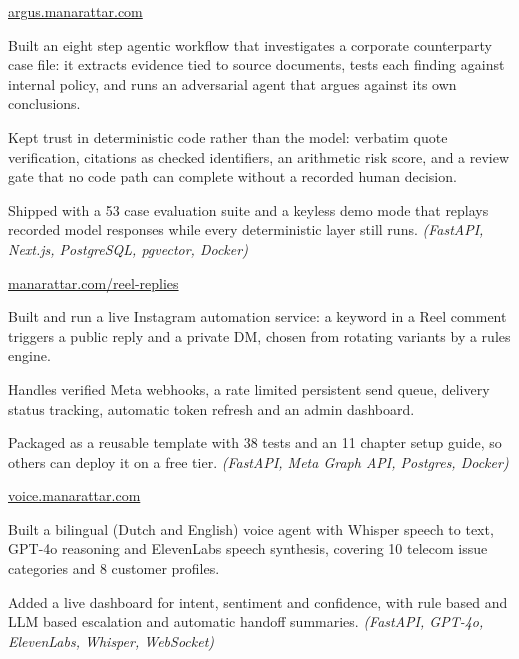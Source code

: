 \documentclass[10pt]{article}
\newcommand{\product}[2]{\Needspace{4\baselineskip}\vspace{2pt}{\bfseries #1}\hfill{\footnotesize #2}\par\vspace{-1pt}}
\newcommand{\live}[2]{\href{https://#1}{\color{link}#2}}
\begin{document}
\product{ARGUS: Agentic Risk Governance and Understanding System}{\live{argus.manarattar.com}{argus.manarattar.com}}
\begin{tights}
  \item Built an eight step agentic workflow that investigates a corporate counterparty case file: it extracts evidence tied to source documents, tests each finding against internal policy, and runs an adversarial agent that argues against its own conclusions.
  \item Kept trust in deterministic code rather than the model: verbatim quote verification, citations as checked identifiers, an arithmetic risk score, and a review gate that no code path can complete without a recorded human decision.
  \item Shipped with a 53 case evaluation suite and a keyless demo mode that replays recorded model responses while every deterministic layer still runs. {\footnotesize\color{gray}\textit{(FastAPI, Next.js, PostgreSQL, pgvector, Docker)}}
\end{tights}

\product{Reel Replies: Instagram Comment to Reply and DM Automation}{\live{manarattar.com/reel-replies/}{manarattar.com/reel-replies}}
\begin{tights}
  \item Built and run a live Instagram automation service: a keyword in a Reel comment triggers a public reply and a private DM, chosen from rotating variants by a rules engine.
  \item Handles verified Meta webhooks, a rate limited persistent send queue, delivery status tracking, automatic token refresh and an admin dashboard.
  \item Packaged as a reusable template with 38 tests and an 11 chapter setup guide, so others can deploy it on a free tier. {\footnotesize\color{gray}\textit{(FastAPI, Meta Graph API, Postgres, Docker)}}
\end{tights}

\product{TelecomNL Voice AI Assistant}{\live{voice.manarattar.com}{voice.manarattar.com}}
\begin{tights}
  \item Built a bilingual (Dutch and English) voice agent with Whisper speech to text, GPT-4o reasoning and ElevenLabs speech synthesis, covering 10 telecom issue categories and 8 customer profiles.
  \item Added a live dashboard for intent, sentiment and confidence, with rule based and LLM based escalation and automatic handoff summaries. {\footnotesize\color{gray}\textit{(FastAPI, GPT-4o, ElevenLabs, Whisper, WebSocket)}}
\end{tights}
\end{document}
